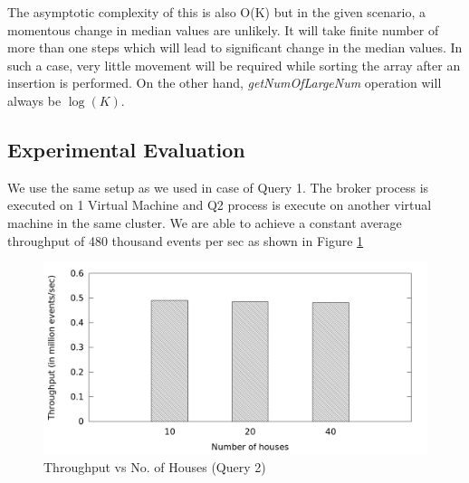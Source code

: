 The asymptotic complexity of this is also O(K) but in the given scenario, a momentous change in median values are unlikely. It will take finite number of more than one steps which will lead to significant change in the median values. In such a case, very little movement will be required while sorting the array after an insertion is performed. On the other hand, \textit{getNumOfLargeNum} operation will always be $\log(K)$.


 
\subsection{Experimental Evaluation}
We use the same setup as we used in case of Query 1. The broker process is executed on 1 Virtual Machine and Q2 process is execute on another virtual machine in the same cluster. We are able to achieve a constant average throughput of 480 thousand events per sec as shown in Figure \ref{fig:q2_throughput}

\begin{figure}[h]
\begin{center}
	\includegraphics[scale=0.55]{img/q2_throughput}
	\vspace*{-0.4cm}
	\caption{Throughput vs No. of Houses (Query 2) \label{fig:q2_throughput}}
\end{center}
\end{figure}

